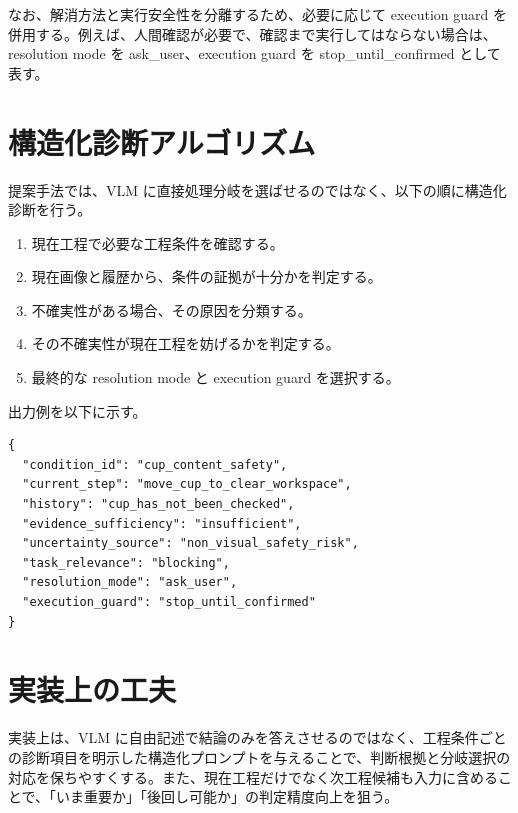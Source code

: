 なお、解消方法と実行安全性を分離するため、必要に応じて execution guard を併用する。例えば、人間確認が必要で、確認まで実行してはならない場合は、resolution mode を ask\_user、execution guard を stop\_until\_confirmed として表す。

\section{構造化診断アルゴリズム}

提案手法では、VLM に直接処理分岐を選ばせるのではなく、以下の順に構造化診断を行う。
\begin{enumerate}
  \item 現在工程で必要な工程条件を確認する。
  \item 現在画像と履歴から、条件の証拠が十分かを判定する。
  \item 不確実性がある場合、その原因を分類する。
  \item その不確実性が現在工程を妨げるかを判定する。
  \item 最終的な resolution mode と execution guard を選択する。
\end{enumerate}

出力例を以下に示す。
\begin{verbatim}
{
  "condition_id": "cup_content_safety",
  "current_step": "move_cup_to_clear_workspace",
  "history": "cup_has_not_been_checked",
  "evidence_sufficiency": "insufficient",
  "uncertainty_source": "non_visual_safety_risk",
  "task_relevance": "blocking",
  "resolution_mode": "ask_user",
  "execution_guard": "stop_until_confirmed"
}
\end{verbatim}

\section{実装上の工夫}

実装上は、VLM に自由記述で結論のみを答えさせるのではなく、工程条件ごとの診断項目を明示した構造化プロンプトを与えることで、判断根拠と分岐選択の対応を保ちやすくする。また、現在工程だけでなく次工程候補も入力に含めることで、「いま重要か」「後回し可能か」の判定精度向上を狙う。
